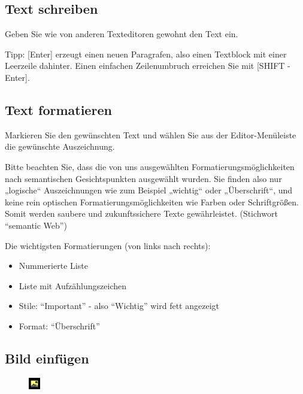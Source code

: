 \documentclass[article, a4paper, oneside, 11pt]{memoir}
\begin{document}
\subsection{Text schreiben}

Geben Sie wie von anderen Texteditoren gewohnt den Text ein.

Tipp: [Enter] erzeugt einen neuen Paragrafen, also einen Textblock mit einer Leerzeile dahinter. Einen einfachen Zeilenumbruch erreichen Sie mit [SHIFT - Enter].

\subsection{Text formatieren}

Markieren Sie den gewünschten Text und wählen Sie aus der Editor-Menüleiste die gewünschte Auszeichnung.

Bitte beachten Sie, dass die von uns ausgewählten
Formatierungsmöglichkeiten nach semantischen Gesichtspunkten ausgewählt
wurden. Sie finden also nur „logische“ Auszeichnungen wie zum Beispiel
„wichtig“ oder „Überschrift“, und keine rein optischen
Formatierungsmöglichkeiten wie Farben oder Schriftgrößen. Somit werden
saubere und zukunftssichere Texte gewährleistet. (Stichwort "`semantic
Web"')

Die wichtigsten Formatierungen (von links nach rechts):

\begin{itemize}
\item Nummerierte Liste
\item Liste mit Aufzählungszeichen
\item Stile: "`Important"' - also "`Wichtig"' wird fett angezeigt
\item Format: "`Überschrift"'
\end{itemize}



\subsection{Bild einfügen}

\begin{figure}
\centering
\includegraphics[width=0.5cm,height=0.5cm]{image_icon}
\end{figure}
\end{document}
